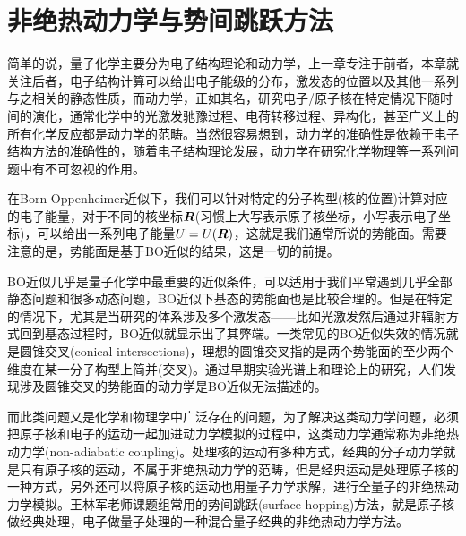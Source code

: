 \documentclass[12pt,a4paper,openany,twoside]{book}
\numberwithin{equation}{section}
\begin{document}
    \chapter{非绝热动力学与势间跳跃方法}
      简单的说，量子化学主要分为电子结构理论和动力学，上一章专注于前者，本章就关注后者，电子结构计算可以给出电子能级的分布，激发态的位置以及其他一系列与之相关的静态性质，而动力学，正如其名，研究电子/原子核在特定情况下随时间的演化，通常化学中的光激发驰豫过程、电荷转移过程、异构化，甚至广义上的所有化学反应都是动力学的范畴。当然很容易想到，动力学的准确性是依赖于电子结构方法的准确性的，随着电子结构理论发展，动力学在研究化学物理等一系列问题中有不可忽视的作用。

      在Born-Oppenheimer近似下，我们可以针对特定的分子构型(核的位置)计算对应的电子能量，对于不同的核坐标$\vb*{R}$(习惯上大写表示原子核坐标，小写表示电子坐标)，可以给出一系列电子能量$U=U(\vb*{R})$，这就是我们通常所说的势能面。需要注意的是，势能面是基于BO近似的结果，这是一切的前提。
      
      BO近似几乎是量子化学中最重要的近似条件，可以适用于我们平常遇到几乎全部静态问题和很多动态问题，BO近似下基态的势能面也是比较合理的。但是在特定的情况下，尤其是当研究的体系涉及多个激发态——比如光激发然后通过非辐射方式回到基态过程时，BO近似就显示出了其弊端。一类常见的BO近似失效的情况就是圆锥交叉(conical intersections)，理想的圆锥交叉指的是两个势能面的至少两个维度在某一分子构型上简并(交叉)。通过早期实验光谱上和理论上的研究，人们发现涉及圆锥交叉的势能面的动力学是BO近似无法描述的。
      
      而此类问题又是化学和物理学中广泛存在的问题，为了解决这类动力学问题，必须把原子核和电子的运动一起加进动力学模拟的过程中，这类动力学通常称为非绝热动力学(non-adiabatic coupling)。处理核的运动有多种方式，经典的分子动力学就是只有原子核的运动，不属于非绝热动力学的范畴，但是经典运动是处理原子核的一种方式，另外还可以将原子核的运动也用量子力学求解，进行全量子的非绝热动力学模拟。王林军老师课题组常用的势间跳跃(surface hopping)方法，就是原子核做经典处理，电子做量子处理的一种混合量子经典的非绝热动力学方法。
\end{document}

